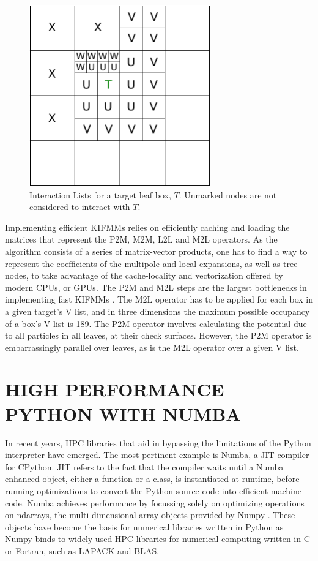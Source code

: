 \documentclass{IEEEcsmag}
\begin{document}
\begin{figure}
\centerline{\includegraphics[width=18.5pc]{figures/interaction_lists.pdf}}
\caption{Interaction Lists for a target leaf box, $T$. Unmarked nodes are not considered to interact with $T$.}
\label{fig:interaction_lists}
\end{figure}

Implementing efficient KIFMMs relies on efficiently caching and loading the matrices that represent the P2M, M2M, L2L and M2L operators. As the algorithm consists of a series of matrix-vector products, one has to find a way to represent the coefficients of the multipole and local expansions, as well as tree nodes, to take advantage of the cache-locality and vectorization offered by modern CPUs, or GPUs. The P2M and M2L steps are the largest bottlenecks in implementing fast KIFMMs \cite{Lashuk2012}. The M2L operator has to be applied for each box in a given target's V list, and in three dimensions the maximum possible occupancy of a box's V list is 189. The P2M operator involves calculating the potential due to all particles in all leaves, at their check surfaces. However, the P2M operator is embarrassingly parallel over leaves, as is the M2L operator over a given V list.

\section{HIGH PERFORMANCE PYTHON WITH NUMBA}

In recent years, HPC libraries that aid in bypassing the limitations of the Python interpreter have emerged. The most pertinent example is Numba, a JIT compiler for CPython. JIT refers to the fact that the compiler waits until a Numba enhanced object, either a function or a class, is instantiated at runtime, before running optimizations to convert the Python source code into efficient machine code. Numba achieves performance by focussing solely on optimizing operations on ndarrays, the multi-dimensional array objects provided by Numpy . These objects have become the basis for numerical libraries written in Python as Numpy binds to widely used HPC libraries for numerical computing written in C or Fortran, such as LAPACK and BLAS.
\end{document}
